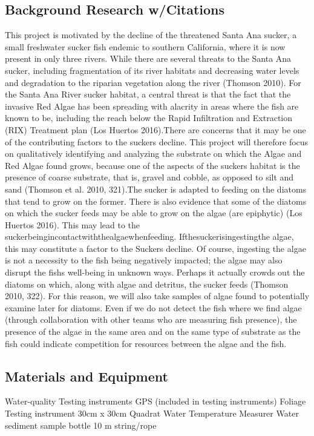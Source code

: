 \documentclass{article}\usepackage[]{graphicx}\usepackage[]{color}
\begin{document}
\subsection{Background Research w/Citations} 
This project is motivated by the decline of the threatened Santa Ana sucker, a small freshwater sucker ﬁsh endemic to southern California, where it is now present in only three rivers. While there are several threats to the Santa Ana sucker, including fragmentation of its river habitats and decreasing water levels and degradation to the riparian vegetation along the river (Thomson 2010). For the Santa Ana River sucker habitat, a central threat is that the fact that the invasive Red Algae has been spreading with alacrity in areas where the ﬁsh are known to be, including the reach below the Rapid Inﬁltration and Extraction (RIX) Treatment plan (Los Huertos 2016).There are concerns that it may be one of the contributing factors to the suckers decline. This project will therefore focus on qualitatively identifying and analyzing the substrate on which the Algae and Red Algae found grows, because one of the aspects of the suckers habitat is the presence of coarse substrate, that is, gravel and cobble, as opposed to silt and sand (Thomson et al. 2010, 321).The sucker is adapted to feeding on the diatoms that tend to grow on the former. There is also evidence that some of the diatoms on which the sucker feeds may be able to grow on the algae (are epiphytic) (Los Huertos 2016). This may lead to the suckerbeingincontactwiththealgaewhenfeeding. Ifthesuckerisingestingthe algae, this may constitute a factor to the Suckers decline. Of course, ingesting the algae is not a necessity to the ﬁsh being negatively impacted; the algae may also disrupt the ﬁshs well-being in unknown ways. Perhaps it actually crowds out the diatoms on which, along with algae and detritus, the sucker feeds (Thomson 2010, 322). For this reason, we will also take samples of algae found to potentially examine later for diatoms. Even if we do not detect the ﬁsh where we ﬁnd algae (through collaboration with other teams who are measuring ﬁsh presence), the presence of the algae in the same area and on the same type of substrate as the ﬁsh could indicate competition for resources between the algae and the ﬁsh.


\subsection{Materials and Equipment}
Water-quality Testing instruments GPS (included in testing instruments) Foliage Testing instrument 30cm x 30cm Quadrat Water Temperature Measurer Water sediment sample bottle 10 m string/rope
\end{document}
